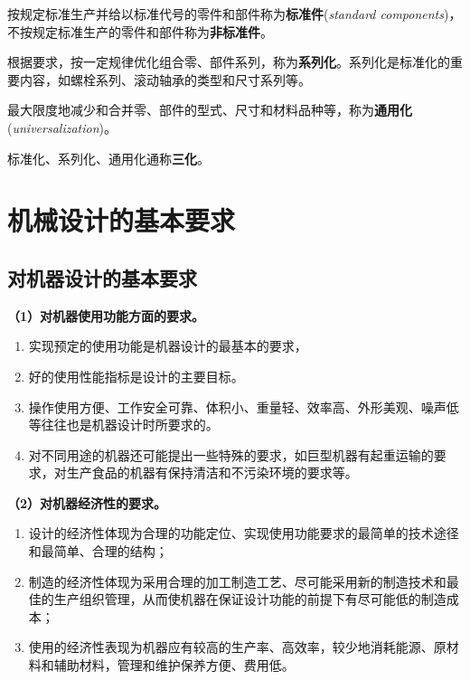 \begin{definition}[标准件与非标准件]
\label{def:标准件}
按规定标准生产并给以标准代号的零件和部件称为\textbf{标准件}(\emph{standard components})，不按规定标准生产的零件和部件称为\textbf{非标准件}。
\end{definition}

\begin{definition}[系列化]
\label{def:系列化}
根据要求，按一定规律优化组合零、部件系列，称为\textbf{系列化}。系列化是标准化的重要内容，如螺栓系列、滚动轴承的类型和尺寸系列等。
\end{definition}

\begin{definition}[通用化]
\label{def:通用化}
最大限度地减少和合并零、部件的型式、尺寸和材料品种等，称为\textbf{通用化}(\emph{universalization})。
\end{definition}

\begin{keybox}[三化]
标准化、系列化、通用化通称\textbf{三化}。
\end{keybox}

\section{机械设计的基本要求}
\label{sec:机械设计的基本要求}

\subsection{对机器设计的基本要求}

\textbf{（1）对机器使用功能方面的要求。}

\begin{enumerate}
	\item 实现预定的使用功能是机器设计的最基本的要求，
	\item 好的使用性能指标是设计的主要目标。
	\item 操作使用方便、工作安全可靠、体积小、重量轻、效率高、外形美观、噪声低等往往也是机器设计时所要求的。
	\item 对不同用途的机器还可能提出一些特殊的要求，如巨型机器有起重运输的要求，对生产食品的机器有保持清洁和不污染环境的要求等。
\end{enumerate}

\textbf{（2）对机器经济性的要求。}

\begin{enumerate}
	\item 设计的经济性体现为合理的功能定位、实现使用功能要求的最简单的技术途径和最简单、合理的结构；
	\item 制造的经济性体现为采用合理的加工制造工艺、尽可能采用新的制造技术和最佳的生产组织管理，从而使机器在保证设计功能的前提下有尽可能低的制造成本；
	\item 使用的经济性表现为机器应有较高的生产率、高效率，较少地消耗能源、原材料和辅助材料，管理和维护保养方便、费用低。
\end{enumerate}

